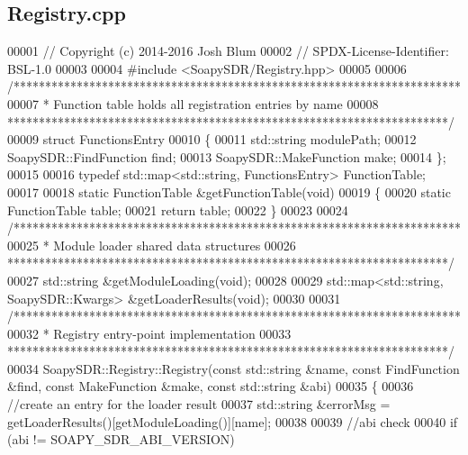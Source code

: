 \subsection{Registry.\+cpp}
\label{Registry_8cpp_source}

\begin{DoxyCode}
00001 \textcolor{comment}{// Copyright (c) 2014-2016 Josh Blum}
00002 \textcolor{comment}{// SPDX-License-Identifier: BSL-1.0}
00003 
00004 \textcolor{preprocessor}{#include <SoapySDR/Registry.hpp>}
00005 
00006 \textcolor{comment}{/***********************************************************************}
00007 \textcolor{comment}{ * Function table holds all registration entries by name}
00008 \textcolor{comment}{ **********************************************************************/}
00009 \textcolor{keyword}{struct }FunctionsEntry
00010 \{
00011     std::string modulePath;
00012     SoapySDR::FindFunction find;
00013     SoapySDR::MakeFunction make;
00014 \};
00015 
00016 \textcolor{keyword}{typedef} std::map<std::string, FunctionsEntry> FunctionTable;
00017 
00018 \textcolor{keyword}{static} FunctionTable &getFunctionTable(\textcolor{keywordtype}{void})
00019 \{
00020     \textcolor{keyword}{static} FunctionTable table;
00021     \textcolor{keywordflow}{return} table;
00022 \}
00023 
00024 \textcolor{comment}{/***********************************************************************}
00025 \textcolor{comment}{ * Module loader shared data structures}
00026 \textcolor{comment}{ **********************************************************************/}
00027 std::string &getModuleLoading(\textcolor{keywordtype}{void});
00028 
00029 std::map<std::string, SoapySDR::Kwargs> &getLoaderResults(\textcolor{keywordtype}{void});
00030 
00031 \textcolor{comment}{/***********************************************************************}
00032 \textcolor{comment}{ * Registry entry-point implementation}
00033 \textcolor{comment}{ **********************************************************************/}
00034 SoapySDR::Registry::Registry(\textcolor{keyword}{const} std::string &name, \textcolor{keyword}{const} FindFunction &find, \textcolor{keyword}{const} 
      MakeFunction &make, \textcolor{keyword}{const} std::string &abi)
00035 \{
00036     \textcolor{comment}{//create an entry for the loader result}
00037     std::string &errorMsg = getLoaderResults()[getModuleLoading()][name];
00038 
00039     \textcolor{comment}{//abi check}
00040     \textcolor{keywordflow}{if} (abi != SOAPY_SDR_ABI_VERSION)

\end{DoxyCode}
